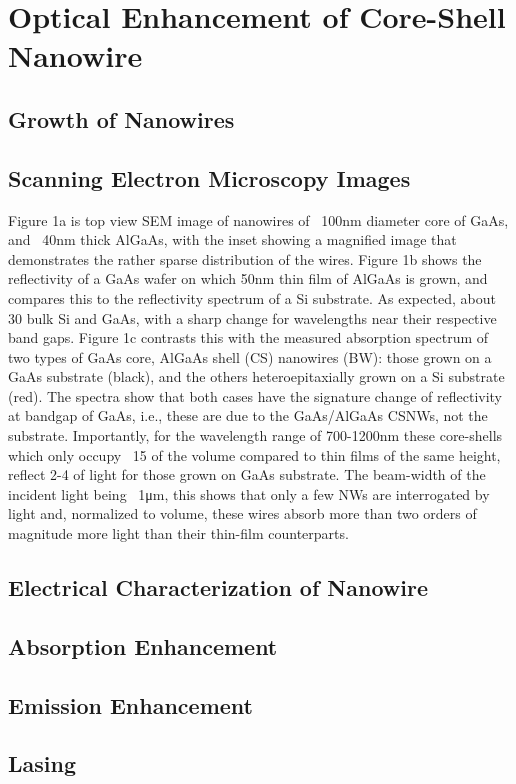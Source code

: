 \chapter{Optical Enhancement of Core-Shell Nanowire} \label{data}


\section{Growth of Nanowires}



\section{Scanning Electron Microscopy Images}
Figure 1a is top view SEM image of nanowires of ~100nm diameter core of GaAs, and ~40nm thick AlGaAs,
with the inset showing a magnified image that demonstrates the rather sparse distribution of the wires. Figure 1b
shows the reflectivity of a GaAs wafer on which 50nm thin film of AlGaAs is grown, and compares this to the
reflectivity spectrum of a Si substrate. As expected, about 30%
bulk Si and GaAs, with a sharp change for wavelengths near their respective band gaps. Figure 1c contrasts this with
the measured absorption spectrum of two types of GaAs core, AlGaAs shell (CS) nanowires (BW): those grown on a
GaAs substrate (black), and the others heteroepitaxially grown on a Si substrate (red). The spectra show that both
cases have the signature change of reflectivity at bandgap of GaAs, i.e., these are due to the GaAs/AlGaAs CSNWs,
not the substrate. Importantly, for the wavelength range of 700-1200nm these core-shells which only occupy ~15%
of the volume compared to thin films of the same height, reflect 2-4%
of light for those grown on GaAs substrate. The beam-width of the incident light being ~1μm, this shows that only
a few NWs are interrogated by light and, normalized to volume, these wires absorb more than two orders of
magnitude more light than their thin-film counterparts.

\section{Electrical Characterization of Nanowire}

\section{Absorption Enhancement} \label{X-ray}


\section{Emission Enhancement} \label{Dust_data}


\section{Lasing} \label{BH_data}

